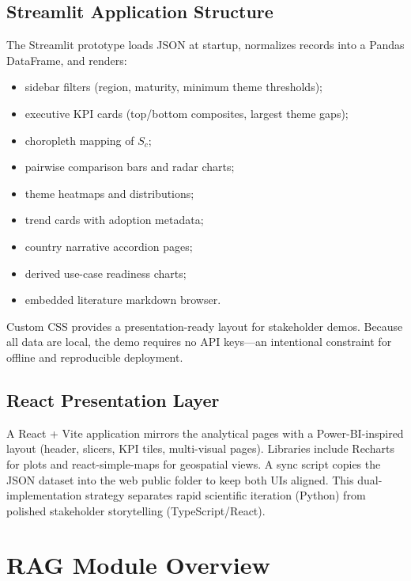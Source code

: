 \subsection{Streamlit Application Structure}
\label{sec:streamlit}

The Streamlit prototype loads JSON at startup, normalizes records into a Pandas DataFrame, and renders:
\begin{itemize}[noitemsep]
  \item sidebar filters (region, maturity, minimum theme thresholds);
  \item executive KPI cards (top/bottom composites, largest theme gaps);
  \item choropleth mapping of $S_c$;
  \item pairwise comparison bars and radar charts;
  \item theme heatmaps and distributions;
  \item trend cards with adoption metadata;
  \item country narrative accordion pages;
  \item derived use-case readiness charts;
  \item embedded literature markdown browser.
\end{itemize}
Custom CSS provides a presentation-ready layout for stakeholder demos. Because all data are local, the demo requires no API keys---an intentional constraint for offline and reproducible deployment.

\subsection{React Presentation Layer}
\label{sec:react}

A React + Vite application mirrors the analytical pages with a Power-BI-inspired layout (header, slicers, KPI tiles, multi-visual pages). Libraries include Recharts for plots and react-simple-maps for geospatial views. A sync script copies the JSON dataset into the web public folder to keep both UIs aligned. This dual-implementation strategy separates rapid scientific iteration (Python) from polished stakeholder storytelling (TypeScript/React).



\section{RAG Module Overview}
\label{sec:rag-overview-meth}


